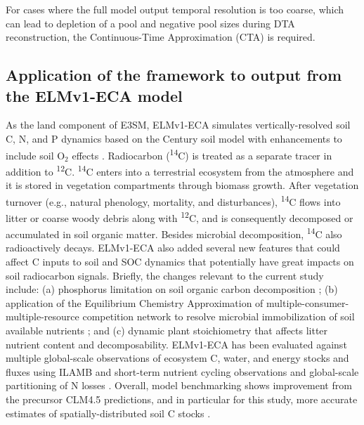 \documentclass[draft]{agujournal2019}
\begin{document}
    For cases where the full model output temporal resolution is too coarse, which can lead to depletion of a pool and negative pool sizes during DTA reconstruction, the Continuous-Time Approximation (CTA) is required.

\subsection{Application of the framework to output from the ELMv1-ECA model}

    As the land component of E3SM, ELMv1-ECA \cite{Riley2018, Zhu2019} simulates vertically-resolved soil C, N, and P dynamics based on the Century soil model \cite{Parton1993} with enhancements  to include soil O$_2$ effects \cite{Koven2013}. Radiocarbon (\textsuperscript{14}C) is treated as a separate tracer in addition to \textsuperscript{12}C. \textsuperscript{14}C enters into a terrestrial ecosystem from the atmosphere \cite{Graven2017} and it is stored in vegetation compartments through biomass growth. After vegetation turnover (e.g., natural phenology, mortality, and disturbances), \textsuperscript{14}C flows into litter or coarse woody debris  along with \textsuperscript{12}C, and is consequently decomposed or accumulated in soil organic matter. Besides microbial decomposition, \textsuperscript{14}C also radioactively decays. ELMv1-ECA also added several new features that could affect C inputs to soil and SOC dynamics that potentially have great impacts on soil radiocarbon signals. Briefly, the changes relevant to the current study include: (a) phosphorus limitation on soil organic carbon decomposition \cite{zhu2016bg}; (b) application of the Equilibrium Chemistry Approximation of multiple-consumer-multiple-resource competition network to resolve microbial immobilization of soil available nutrients \cite{Tang2013, Zhu2017ea}; and (c) dynamic plant stoichiometry that affects litter nutrient content and decomposability. ELMv1-ECA has been evaluated against multiple global-scale observations of ecosystem C, water, and energy stocks and fluxes using ILAMB \cite{Collier2018, Zhu2019} and short-term nutrient cycling observations and global-scale partitioning of N losses \cite{Zhu2015ncc, Riley2018}. Overall, model benchmarking shows improvement from the precursor CLM4.5 predictions, and in particular for this study, more accurate estimates of spatially-distributed soil C stocks \cite{Zhu2019}.
\end{document}
